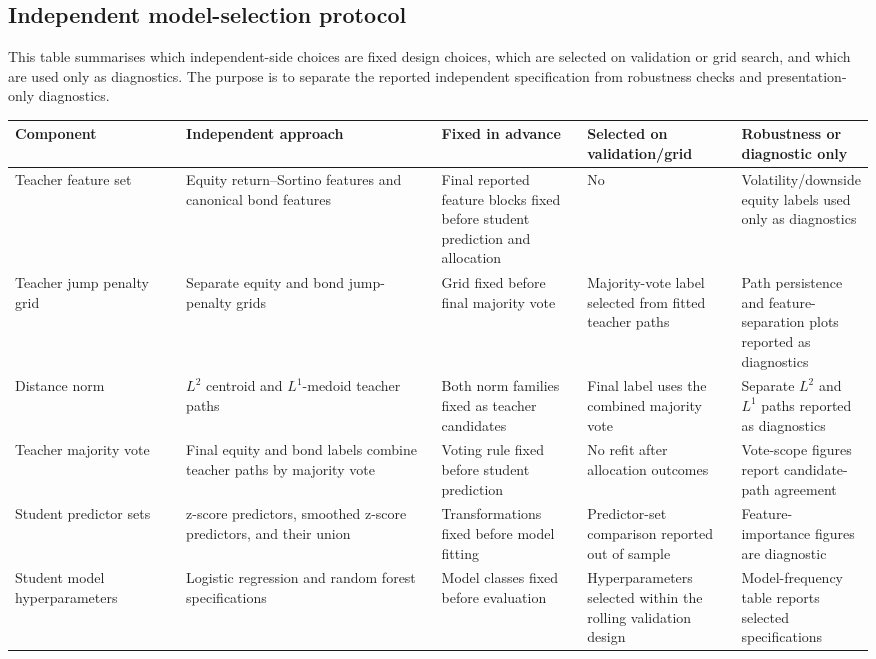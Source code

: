 \FloatBarrier

\subsection{Independent model-selection protocol}
\label{app:independent-model-selection-protocol}

This table summarises which independent-side choices are fixed design choices, which are
selected on validation or grid search, and which are used only as diagnostics. The purpose is
to separate the reported independent specification from robustness checks and presentation-only
diagnostics.

\begin{table}[H]
\centering
\small
\begin{adjustbox}{center,max width=\linewidth}
\begin{tabular}{p{0.20\linewidth}p{0.30\linewidth}p{0.17\linewidth}p{0.18\linewidth}p{0.18\linewidth}}
\toprule
Component & Independent approach & Fixed in advance & Selected on validation/grid & Robustness or diagnostic only \\
\midrule
Teacher feature set & Equity return--Sortino features and canonical bond features & Final reported feature blocks fixed before student prediction and allocation & No & Volatility/downside equity labels used only as diagnostics \\
Teacher jump penalty grid & Separate equity and bond jump-penalty grids & Grid fixed before final majority vote & Majority-vote label selected from fitted teacher paths & Path persistence and feature-separation plots reported as diagnostics \\
Distance norm & $L^2$ centroid and $L^1$-medoid teacher paths & Both norm families fixed as teacher candidates & Final label uses the combined majority vote & Separate $L^2$ and $L^1$ paths reported as diagnostics \\
Teacher majority vote & Final equity and bond labels combine teacher paths by majority vote & Voting rule fixed before student prediction & No refit after allocation outcomes & Vote-scope figures report candidate-path agreement \\
Student predictor sets & z-score predictors, smoothed z-score predictors, and their union & Transformations fixed before model fitting & Predictor-set comparison reported out of sample & Feature-importance figures are diagnostic \\
Student model hyperparameters & Logistic regression and random forest specifications & Model classes fixed before evaluation & Hyperparameters selected within the rolling validation design & Model-frequency table reports selected specifications \\

\end{tabular}
\end{adjustbox}
\end{table}
